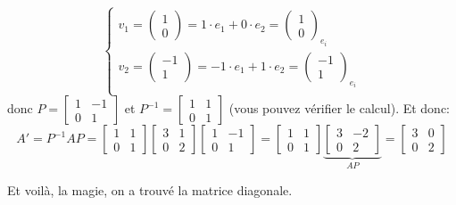 \begin{eg}
\begin{enumerate}
             \[
            \begin{cases}
                v_1 = \begin{pmatrix} 1 \\ 0 \end{pmatrix} = 1 \cdot e_1 + 0 \cdot e_2 = \begin{pmatrix} 1 \\ 0 \end{pmatrix}_{e_i} \\
                v_2 = \begin{pmatrix} -1 \\ 1 \end{pmatrix} = -1 \cdot e_1 + 1 \cdot e_2 = \begin{pmatrix} -1 \\ 1 \end{pmatrix}_{e_i} \\
            \end{cases}
            \] 
              donc $P = \begin{bmatrix} 1 & -1\\ 0 & 1 \end{bmatrix} $ et $P^{-1} = \begin{bmatrix} 1 & 1 \\ 0 & 1  \end{bmatrix}$ (vous pouvez vérifier le calcul). Et donc:
              \[
                  A' = P^{-1}AP = \begin{bmatrix} 1 & 1 \\ 0 & 1 \end{bmatrix} \begin{bmatrix} 3 & 1 \\ 0 & 2 \end{bmatrix} \begin{bmatrix} 1 & -1 \\ 0 & 1 \end{bmatrix} = \begin{bmatrix} 1 & 1 \\ 0 & 1 \end{bmatrix} \underbrace{\begin{bmatrix} 3 & -2 \\ 0 & 2 \end{bmatrix}}_{AP} = \begin{bmatrix} 3 & 0 \\ 0 & 2 \end{bmatrix} 
              \] 
     \end{enumerate}
     Et voilà, la magie, on a trouvé la matrice diagonale.
\end{eg}
